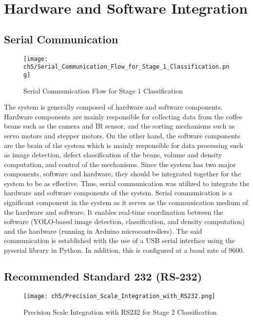 \section{Hardware and Software Integration}

\subsection{Serial Communication}
\label{sec:serial_communication}
\begin{figure}[H]
    \centering
    \texttt{[image: ch5/Serial\_Communication\_Flow\_for\_Stage\_1\_Classification.png]}
    \caption{Serial Communication Flow for Stage 1 Classification}
    \label{fig:serial_comm_flow}
\end{figure}

The system is generally composed of hardware and software components. Hardware components are mainly responsible for collecting data from the coffee beans such as the camera and IR sensor, and the sorting mechanisms such as servo motors and stepper motors. On the other hand, the software components are the brain of the system which is mainly responsible for data processing such as image detection, defect classification of the beans, volume and density computation, and control of the mechanisms. Since the system has two major components, software and hardware, they should be integrated together for the system to be as effective. Thus, serial communication was utilized to integrate the hardware and software components of the system. Serial communication is a significant component in the system as it serves as the communication medium of the hardware and software. It enables real-time coordination between the software (YOLO-based image detection, classification, and density computation) and the hardware (running in Arduino microcontrollers). The said communication is established with the use of a USB serial interface using the pyserial library in Python. In addition, this is configured at a baud rate of 9600.


\subsection{Recommended Standard 232 (RS-232)}
\begin{figure}[H]
    \centering
    \texttt{[image: ch5/Precision\_Scale\_Integration\_with\_RS232.png]}
    \caption{Precision Scale Integration with RS232 for Stage 2 Classification}
    \label{fig:rs232}
\end{figure}

